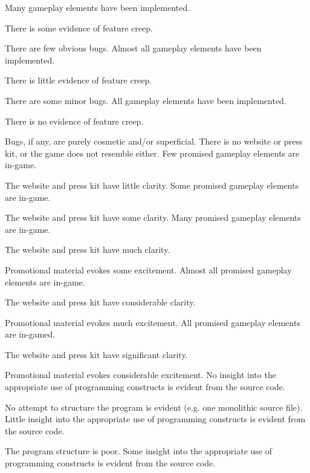 \documentclass{../../fal_assignment}
\begin{document}
\begin{markingrubric}
        \grade Many gameplay elements have been implemented.
            \par There is some evidence of feature creep.
            \par There are few obvious bugs.
        \grade Almost all gameplay elements have been implemented.
            \par There is little evidence of feature creep.
            \par There are some minor bugs.
        \grade All gameplay elements have been implemented.
            \par There is no evidence of feature creep.
            \par Bugs, if any, are purely cosmetic and/or superficial.
%            
        \grade\fail There is no website or press kit, or the game does not resemble either.
        \grade Few promised gameplay elements are in-game.
            \par The website and press kit have little clarity.
        \grade Some promised gameplay elements are in-game.
            \par The website and press kit have some clarity.
        \grade Many promised gameplay elements are in-game.
            \par The website and press kit have much clarity.
            \par Promotional material evokes some excitement.
        \grade Almost all promised gameplay elements are in-game.
            \par The website and press kit have considerable clarity.
            \par Promotional material evokes much excitement.
        \grade All promised gameplay elements are in-gamed.
            \par The website and press kit have significant clarity.
            \par Promotional material evokes considerable excitement.
%
        \grade\fail No insight into the appropriate use of programming constructs is evident from the source code.
            \par No attempt to structure the program is evident (e.g. one monolithic source file).
        \grade Little insight into the appropriate use of programming constructs is evident from the source code.
            \par The program structure is poor.
        \grade Some insight into the appropriate use of programming constructs is evident from the source code.

\end{markingrubric}
\end{document}
